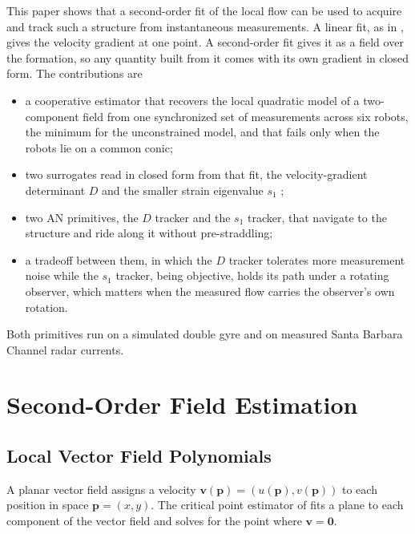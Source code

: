 \documentclass[lettersize,journal]{IEEEtran}
\begin{document}
This paper shows that a second-order fit of the local flow can be used to
acquire and track such a structure from instantaneous measurements. A
linear fit, as in \cite{10}, gives the velocity gradient at one point. A
second-order fit gives it as a field over the formation, so any quantity
built from it comes with its own gradient in closed form. The contributions are
\begin{itemize}
\item a cooperative estimator that recovers the local quadratic model of
a two-component field from one synchronized set of measurements across six robots, the
minimum for the unconstrained model, and that fails only when the robots
lie on a common conic;
\item two surrogates read in closed form from that fit, the
velocity-gradient determinant $D$ and the smaller strain eigenvalue
$s_1$ \cite{19};
\item two AN primitives, the $D$ tracker and the $s_1$ tracker, that
navigate to the structure and ride along it without pre-straddling;
\item a tradeoff between them, in which the $D$ tracker tolerates more
measurement noise while the $s_1$ tracker, being objective, holds its
path under a rotating observer, which matters when the measured flow
carries the observer's own rotation.
\end{itemize}

Both primitives run on a simulated double gyre and on measured Santa
Barbara Channel radar currents.

\section{Second-Order Field Estimation}

\subsection{Local Vector Field Polynomials}

A planar vector field assigns a velocity $\mathbf{v}(\mathbf{p}) =
(u(\mathbf{p}), v(\mathbf{p}))$ to each position in space $\mathbf{p} = (x, y)$.
The critical point estimator of \cite{10} fits a plane to each
component of the vector field and solves for the point where $\mathbf{v} = \mathbf{0}$. 
\end{document}
